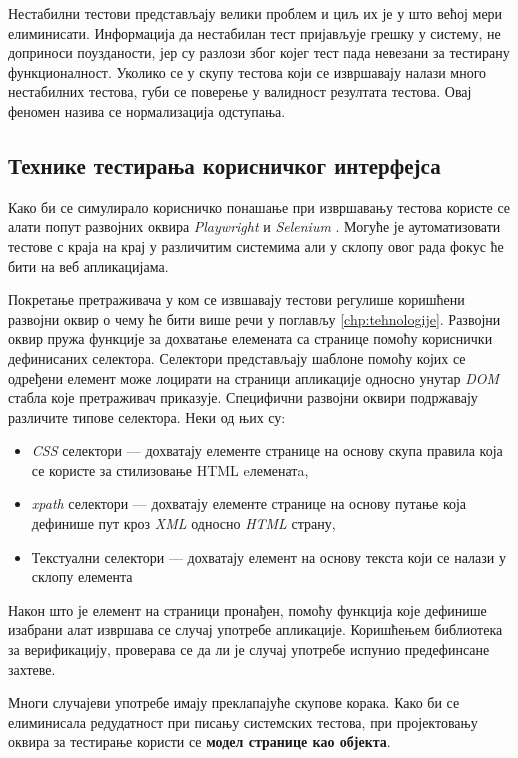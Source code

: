 \documentclass[12pt,oneside]{memoir}
\begin{document}
Нестабилни тестови представљају велики проблем и циљ их је у што већој мери елиминисати. Информација да нестабилан тест пријављује грешку у систему, не доприноси поузданости, јер су разлози због којег тест пада невезани за тестирану функционалност. Уколико се у скупу тестова који се извршавају налази много нестабилних тестова, губи се поверење у валидност резултата тестова. Овај феномен назива се нормализација одступања.



\subsection{Технике тестирања корисничког интерфејса}

Како би се симулирало корисничко понашање при извршавању тестова користе се алати попут развојних оквира \textit{Playwright} \cite{playwright} и \textit{Selenium} \cite{playwrightVsSelenium}. Могуће је аутоматизовати тестове с краја на крај у различитим системима али у склопу овог рада фокус ће бити на веб апликацијама. 

Покретање претраживача у ком се извшавају тестови регулише коришћени развојни оквир о чему ће бити више речи у поглављу \ref{chp:tehnologije}. Развојни оквир пружа функције за дохватање елемената са странице помоћу кориснички дефинисаних селектора. Селектори представљају шаблоне помоћу којих се одређени елемент може лоцирати на страници апликације односно унутар \textit{DOM} стабла које претраживач приказује. Специфични развојни оквири подржавају различите типове селектора. Неки од њих су:

\begin{itemize}
\item \textit{CSS} селектори --- дохватају елементе странице на основу скупа правила која се користе за стилизовање HTML eлеменатa,
\item \textit{xpath} селектори --- дохватају елементе странице на основу путање која дефинише пут кроз \textit{XML} односно \textit{HTML} страну,
\item Текстуални селектори --- дохватају елемент на основу текста који се налази у склопу елемента
\end{itemize}

Након што је елемент на страници пронађен, помоћу функција које дефинише изабрани алат извршава се случај употребе апликације. Коришћењем библиотека за верификацију, проверава се да ли је случај употребе испунио предефинсане захтеве.

Многи случајеви употребе имају преклапајуће скупове корака. Како би се елиминисала редудатност при писању системских тестова, при пројектовању оквира за тестирање користи се \textbf{модел странице као објекта}.
\end{document}
